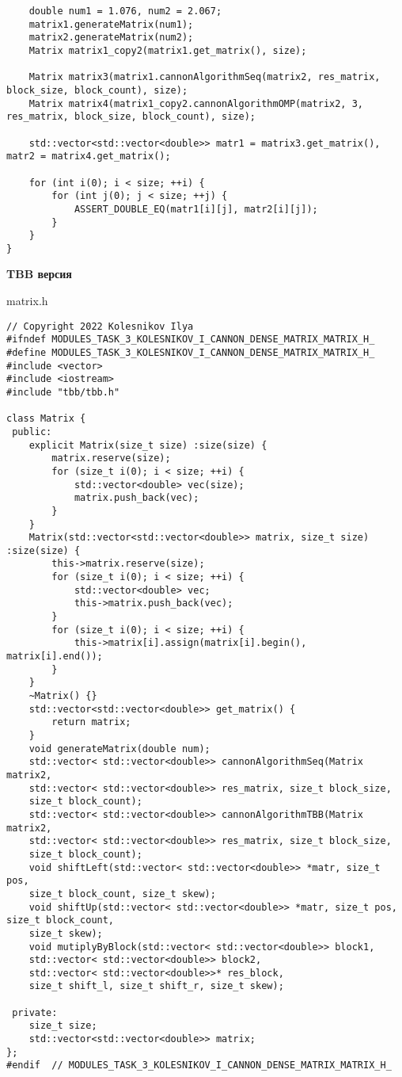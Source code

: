 \documentclass{report}
\begin{document}
\begin{lstlisting}
    double num1 = 1.076, num2 = 2.067;
    matrix1.generateMatrix(num1);
    matrix2.generateMatrix(num2);
    Matrix matrix1_copy2(matrix1.get_matrix(), size);

    Matrix matrix3(matrix1.cannonAlgorithmSeq(matrix2, res_matrix, block_size, block_count), size);
    Matrix matrix4(matrix1_copy2.cannonAlgorithmOMP(matrix2, 3, res_matrix, block_size, block_count), size);

    std::vector<std::vector<double>> matr1 = matrix3.get_matrix(), matr2 = matrix4.get_matrix();

    for (int i(0); i < size; ++i) {
        for (int j(0); j < size; ++j) {
            ASSERT_DOUBLE_EQ(matr1[i][j], matr2[i][j]);
        }
    }
}
\end{lstlisting}

\textbf{TBB версия}


matrix.h
\begin{lstlisting}
// Copyright 2022 Kolesnikov Ilya
#ifndef MODULES_TASK_3_KOLESNIKOV_I_CANNON_DENSE_MATRIX_MATRIX_H_
#define MODULES_TASK_3_KOLESNIKOV_I_CANNON_DENSE_MATRIX_MATRIX_H_
#include <vector>
#include <iostream>
#include "tbb/tbb.h"

class Matrix {
 public:
    explicit Matrix(size_t size) :size(size) {
        matrix.reserve(size);
        for (size_t i(0); i < size; ++i) {
            std::vector<double> vec(size);
            matrix.push_back(vec);
        }
    }
    Matrix(std::vector<std::vector<double>> matrix, size_t size) :size(size) {
        this->matrix.reserve(size);
        for (size_t i(0); i < size; ++i) {
            std::vector<double> vec;
            this->matrix.push_back(vec);
        }
        for (size_t i(0); i < size; ++i) {
            this->matrix[i].assign(matrix[i].begin(), matrix[i].end());
        }
    }
    ~Matrix() {}
    std::vector<std::vector<double>> get_matrix() {
        return matrix;
    }
    void generateMatrix(double num);
    std::vector< std::vector<double>> cannonAlgorithmSeq(Matrix matrix2,
    std::vector< std::vector<double>> res_matrix, size_t block_size,
    size_t block_count);
    std::vector< std::vector<double>> cannonAlgorithmTBB(Matrix matrix2,
    std::vector< std::vector<double>> res_matrix, size_t block_size,
    size_t block_count);
    void shiftLeft(std::vector< std::vector<double>> *matr, size_t pos,
    size_t block_count, size_t skew);
    void shiftUp(std::vector< std::vector<double>> *matr, size_t pos, size_t block_count,
    size_t skew);
    void mutiplyByBlock(std::vector< std::vector<double>> block1,
    std::vector< std::vector<double>> block2,
    std::vector< std::vector<double>>* res_block,
    size_t shift_l, size_t shift_r, size_t skew);

 private:
    size_t size;
    std::vector<std::vector<double>> matrix;
};
#endif  // MODULES_TASK_3_KOLESNIKOV_I_CANNON_DENSE_MATRIX_MATRIX_H_
\end{lstlisting}
\end{document}
